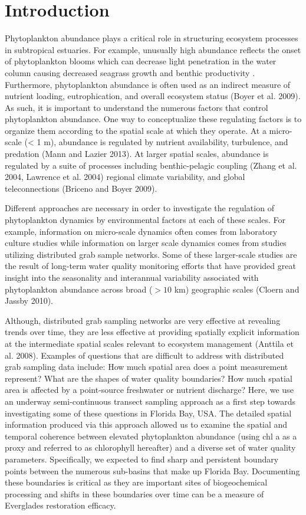 \section{Introduction}
\label{intro}
Phytoplankton abundance plays a critical role in structuring ecosystem processes in subtropical estuaries. For example, unusually high abundance reflects the onset of phytoplankton blooms which can decrease light penetration in the water column causing decreased seagrass growth and benthic productivity \cite{kelble_2005}. Furthermore, phytoplankton abundance is often used as an indirect measure of nutrient loading, eutrophication, and overall ecosystem status (Boyer et al. 2009). As such, it is important to understand the numerous factors that control phytoplankton abundance. One way to conceptualize these regulating factors is to organize them according to the spatial scale at which they operate. At a micro-scale (< 1 m), abundance is regulated by nutrient availability, turbulence, and predation (Mann and Lazier 2013). At larger spatial scales, abundance is regulated by a suite of processes including benthic-pelagic coupling (Zhang et al. 2004, Lawrence et al. 2004) regional climate variability, and global teleconnections (Briceno and Boyer 2009).

Different approaches are necessary in order to investigate the regulation of phytoplankton dynamics by environmental factors at each of these scales. For example, information on micro-scale dynamics often comes from laboratory culture studies while information on larger scale dynamics comes from studies utilizing distributed grab sample networks. Some of these larger-scale studies are the result of long-term water quality monitoring efforts that have provided great insight into the seasonality and interannual variability associated with phytoplankton abundance across broad ($>10$ km) geographic scales (Cloern and Jassby 2010).

Although, distributed grab sampling networks are very effective at revealing trends over time, they are less effective at providing spatially explicit information at the intermediate spatial scales relevant to ecosystem management (Anttila et al. 2008). Examples of questions that are difficult to address with distributed grab sampling data include: How much spatial area does a point measurement represent? What are the shapes of water quality boundaries? How much spatial area is affected by a point-source freshwater or nutrient discharge? Here, we use an underway semi-continuous transect sampling approach as a first step towards investigating some of these questions in Florida Bay, USA. The detailed spatial information produced via this approach allowed us to examine the spatial and temporal coherence between elevated phytoplankton abundance (using chl a as a proxy and referred to as chlorophyll hereafter) and a diverse set of water quality parameters. Specifically, we expected to find sharp and persistent boundary points between the numerous sub-basins that make up Florida Bay. Documenting these boundaries is critical as they are important sites of biogeochemical processing and shifts in these boundaries over time can be a measure of Everglades restoration efficacy.
